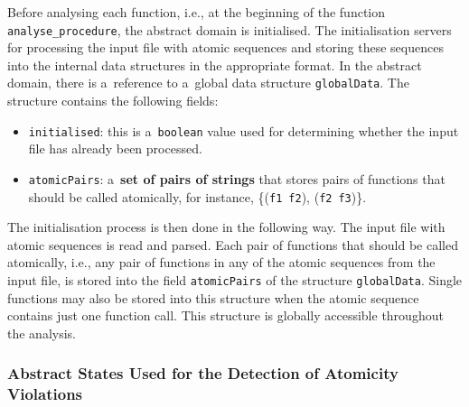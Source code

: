 Before analysing each function, i.e., at the beginning of the function
\texttt{analyse\_procedure}, the abstract domain is initialised. The
initialisation servers for processing the input file with atomic sequences
and storing these sequences into the internal data structures in the
appropriate format. In the abstract domain, there is a~reference to
a~global data structure \texttt{globalData}. The structure contains the
following fields:
\begin{itemize}
    \item
        \texttt{initialised}: this is a~\texttt{boolean} value used for
        determining whether the input file has already been
        processed.

    \item
        \texttt{atomicPairs}: a~\textbf{set of pairs of strings} that 
        stores pairs of functions that should be called
        atomically, for instance, \{(\texttt{f1}~\texttt{f2}),
        (\texttt{f2}~\texttt{f3})\}.
\end{itemize}

The initialisation process is then done in the following way. The input file
with atomic sequences is read and parsed. Each pair of functions that should 
be called atomically, i.e., any pair of functions in any of the atomic 
sequences from the input file, is stored into the field \texttt{atomicPairs} 
of the structure \texttt{globalData}. Single functions may also be stored 
into this structure when the atomic sequence contains just one function call.
This structure is globally accessible throughout the analysis.

\subsubsection{%
    Abstract States Used for the Detection of Atomicity Violations
}


